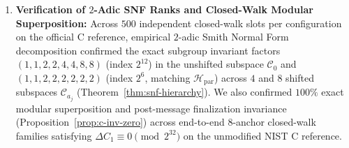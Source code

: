 \documentclass[11pt,a4paper]{article}
\theoremstyle{definition}
\theoremstyle{remark}
\newcommand{\Hpar}{\mathcal{H}_{\mathrm{par}}}
\begin{document}
\begin{enumerate}[leftmargin=2em]
    \item \textbf{Verification of $2$-Adic SNF Ranks and Closed-Walk Modular Superposition:} Across $500$ independent closed-walk slots per configuration on the official C reference, empirical $2$-adic Smith Normal Form decomposition confirmed the exact subgroup invariant factors $(1, 1, 2, 2, 4, 4, 8, 8)$ (index $2^{12}$) in the unshifted subspace $\mathcal{C}_0$ and $(1, 1, 2, 2, 2, 2, 2, 2)$ (index $2^6$, matching $\Hpar$) across $4$ and $8$ shifted subspaces $\mathcal{C}_{a_j}$ (Theorem~\ref{thm:snf-hierarchy}). We also confirmed $100\%$ exact modular superposition and post-message finalization invariance (Proposition~\ref{prop:c-inv-zero}) across end-to-end $8$-anchor closed-walk families satisfying $\Delta C_1 \equiv 0 \pmod{2^{32}}$ on the unmodified NIST C reference.
\end{enumerate}
\end{document}
